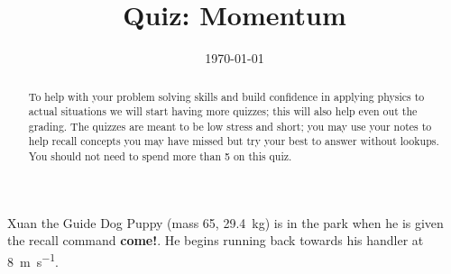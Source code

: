\documentclass[quiz,addpoints,noanswers]{exam}
\title{Quiz: Momentum}
\date{\today}
\author{\mobeardInstructorShort}
\begin{document}
\maketitle
\begin{abstract}
To help with your problem solving skills and build confidence in applying physics to actual situations we will start having more quizzes; this will also help even out the grading. The quizzes are meant to be low stress and short; you may use your notes to help recall concepts you may have missed but try your best to answer without lookups. You should not need to spend more than \SI{5}{\min} on this quiz. 
\end{abstract}

\begin{questions}
\question Xuan the Guide Dog Puppy (mass \SI{65}{\pound}, \SI{29.4}{\kilo\gram}) is in the park when he is given the recall command \textbf{come!}. He begins running back towards his handler at \SI{8}{\meter\per\second}. 
\end{questions}
\end{document}
